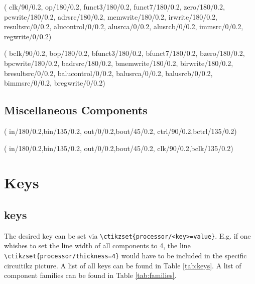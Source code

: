 \documentclass[.52pt,a4paper,titlepage]{article}
\begin{document}
(
clk/90/0.2,
op/180/0.2,
funct3/180/0.2,
funct7/180/0.2,
zero/180/0.2,
pcwrite/180/0.2,
adrsrc/180/0.2,
memwrite/180/0.2,
irwrite/180/0.2,
resultsrc/0/0.2,
alucontrol/0/0.2,
alusrca/0/0.2,
alusrcb/0/0.2,
immsrc/0/0.2,
regwrite/0/0.2)

(
bclk/90/0.2,
bop/180/0.2,
bfunct3/180/0.2,
bfunct7/180/0.2,
bzero/180/0.2,
bpcwrite/180/0.2,
badrsrc/180/0.2,
bmemwrite/180/0.2,
birwrite/180/0.2,
bresultsrc/0/0.2,
balucontrol/0/0.2,
balusrca/0/0.2,
balusrcb/0/0.2,
bimmsrc/0/0.2,
bregwrite/0/0.2)

\subsection{Miscellaneous Components}
(
in/180/0.2,bin/135/0.2,
out/0/0.2,bout/45/0.2,
ctrl/90/0.2,bctrl/135/0.2)

(
in/180/0.2,bin/135/0.2,
out/0/0.2,bout/45/0.2,
clk/90/0.2,bclk/135/0.2)


\section{Keys}
\subsection{\Circuitikz{} keys}
The desired \Circuitikz{} key can be set via \verb|\ctikzset{processor/<key>=value}|. E.g. if one whishes to set the line width of all components to 4, the line  \verb|\ctikzset{processor/thickness=4}| would have to be included in the specific circuitikz picture. A list of all \Circuitikz{} keys can be found in Table \ref{tab:keys}. A list of component families can be found in Table \ref{tab:families}.
\end{document}
